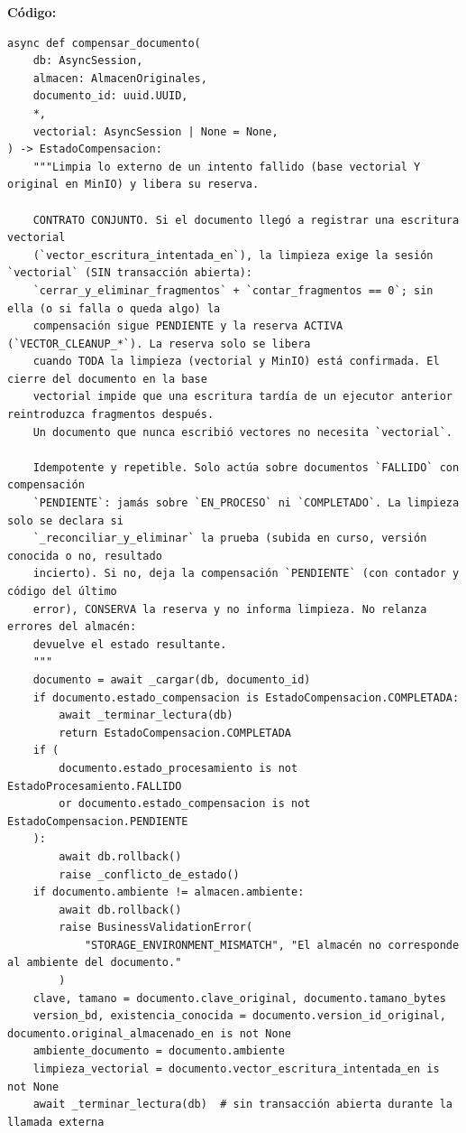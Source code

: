 \documentclass[11pt,a4paper]{article}
\begin{document}
\textbf{Código:}
\begin{lstlisting}
async def compensar_documento(
    db: AsyncSession,
    almacen: AlmacenOriginales,
    documento_id: uuid.UUID,
    *,
    vectorial: AsyncSession | None = None,
) -> EstadoCompensacion:
    """Limpia lo externo de un intento fallido (base vectorial Y original en MinIO) y libera su reserva.

    CONTRATO CONJUNTO. Si el documento llegó a registrar una escritura vectorial
    (`vector_escritura_intentada_en`), la limpieza exige la sesión `vectorial` (SIN transacción abierta):
    `cerrar_y_eliminar_fragmentos` + `contar_fragmentos == 0`; sin ella (o si falla o queda algo) la
    compensación sigue PENDIENTE y la reserva ACTIVA (`VECTOR_CLEANUP_*`). La reserva solo se libera
    cuando TODA la limpieza (vectorial y MinIO) está confirmada. El cierre del documento en la base
    vectorial impide que una escritura tardía de un ejecutor anterior reintroduzca fragmentos después.
    Un documento que nunca escribió vectores no necesita `vectorial`.

    Idempotente y repetible. Solo actúa sobre documentos `FALLIDO` con compensación
    `PENDIENTE`: jamás sobre `EN_PROCESO` ni `COMPLETADO`. La limpieza solo se declara si
    `_reconciliar_y_eliminar` la prueba (subida en curso, versión conocida o no, resultado
    incierto). Si no, deja la compensación `PENDIENTE` (con contador y código del último
    error), CONSERVA la reserva y no informa limpieza. No relanza errores del almacén:
    devuelve el estado resultante.
    """
    documento = await _cargar(db, documento_id)
    if documento.estado_compensacion is EstadoCompensacion.COMPLETADA:
        await _terminar_lectura(db)
        return EstadoCompensacion.COMPLETADA
    if (
        documento.estado_procesamiento is not EstadoProcesamiento.FALLIDO
        or documento.estado_compensacion is not EstadoCompensacion.PENDIENTE
    ):
        await db.rollback()
        raise _conflicto_de_estado()
    if documento.ambiente != almacen.ambiente:
        await db.rollback()
        raise BusinessValidationError(
            "STORAGE_ENVIRONMENT_MISMATCH", "El almacén no corresponde al ambiente del documento."
        )
    clave, tamano = documento.clave_original, documento.tamano_bytes
    version_bd, existencia_conocida = documento.version_id_original, documento.original_almacenado_en is not None
    ambiente_documento = documento.ambiente
    limpieza_vectorial = documento.vector_escritura_intentada_en is not None
    await _terminar_lectura(db)  # sin transacción abierta durante la llamada externa


\end{lstlisting}
\end{document}
